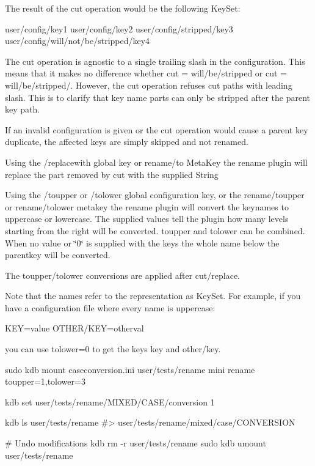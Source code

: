 The result of the cut operation would be the following Key\+Set\+:


\begin{DoxyCode}
user/config/key1
user/config/key2
user/config/stripped/key3
user/config/will/not/be/stripped/key4
\end{DoxyCode}


The cut operation is agnostic to a single trailing slash in the configuration. This means that it makes no difference whether {\ttfamily cut = will/be/stripped} or {\ttfamily cut = will/be/stripped/}. However, the cut operation refuses cut paths with leading slash. This is to clarify that key name parts can only be stripped after the parent key path.

If an invalid configuration is given or the cut operation would cause a parent key duplicate, the affected keys are simply skipped and not renamed.

Using the {\ttfamily /replacewith} global key or {\ttfamily rename/to} Meta\+Key the rename plugin will replace the part removed by {\ttfamily cut} with the supplied String

Using the {\ttfamily /toupper} or {\ttfamily /tolower} global configuration key, or the {\ttfamily rename/toupper} or {\ttfamily rename/tolower} metakey the rename plugin will convert the keynames to uppercase or lowercase. The supplied values tell the plugin how many levels starting from the right will be converted. {\ttfamily toupper} and {\ttfamily tolower} can be combined. When no value or \char`\"{}0\char`\"{} is supplied with the keys the whole name below the parentkey will be converted.

The toupper/tolower conversions are applied after cut/replace.

Note that the names refer to the representation as Key\+Set. For example, if you have a configuration file where every name is uppercase\+:


\begin{DoxyCode}
KEY=value
OTHER/KEY=otherval
\end{DoxyCode}


you can use {\ttfamily tolower=0} to get the keys {\ttfamily key} and {\ttfamily other/key}.


\begin{DoxyCode}
sudo kdb mount caseconversion.ini user/tests/rename mini rename toupper=1,tolower=3

kdb set user/tests/rename/MIXED/CASE/conversion 1

kdb ls user/tests/rename
#> user/tests/rename/mixed/case/CONVERSION

# Undo modifications
kdb rm -r user/tests/rename
sudo kdb umount user/tests/rename
\end{DoxyCode}


